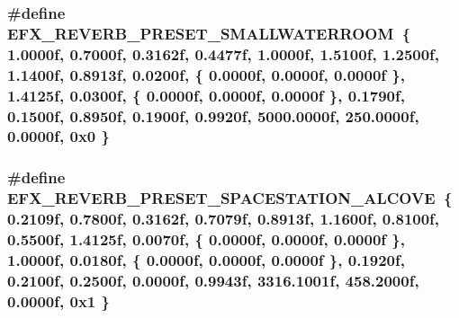 \subsubsection[{\texorpdfstring{E\+F\+X\+\_\+\+R\+E\+V\+E\+R\+B\+\_\+\+P\+R\+E\+S\+E\+T\+\_\+\+S\+M\+A\+L\+L\+W\+A\+T\+E\+R\+R\+O\+OM}{EFX_REVERB_PRESET_SMALLWATERROOM}}]{\setlength{\rightskip}{0pt plus 5cm}\#define E\+F\+X\+\_\+\+R\+E\+V\+E\+R\+B\+\_\+\+P\+R\+E\+S\+E\+T\+\_\+\+S\+M\+A\+L\+L\+W\+A\+T\+E\+R\+R\+O\+OM~\{ 1.\+0000f, 0.\+7000f, 0.\+3162f, 0.\+4477f, 1.\+0000f, 1.\+5100f, 1.\+2500f, 1.\+1400f, 0.\+8913f, 0.\+0200f, \{ 0.\+0000f, 0.\+0000f, 0.\+0000f \}, 1.\+4125f, 0.\+0300f, \{ 0.\+0000f, 0.\+0000f, 0.\+0000f \}, 0.\+1790f, 0.\+1500f, 0.\+8950f, 0.\+1900f, 0.\+9920f, 5000.\+0000f, 250.\+0000f, 0.\+0000f, 0x0 \}}\hypertarget{efx-presets_8h_aa3515cb632217a8fb55f06da1a4a7d1e}{}\label{efx-presets_8h_aa3515cb632217a8fb55f06da1a4a7d1e}
\subsubsection[{\texorpdfstring{E\+F\+X\+\_\+\+R\+E\+V\+E\+R\+B\+\_\+\+P\+R\+E\+S\+E\+T\+\_\+\+S\+P\+A\+C\+E\+S\+T\+A\+T\+I\+O\+N\+\_\+\+A\+L\+C\+O\+VE}{EFX_REVERB_PRESET_SPACESTATION_ALCOVE}}]{\setlength{\rightskip}{0pt plus 5cm}\#define E\+F\+X\+\_\+\+R\+E\+V\+E\+R\+B\+\_\+\+P\+R\+E\+S\+E\+T\+\_\+\+S\+P\+A\+C\+E\+S\+T\+A\+T\+I\+O\+N\+\_\+\+A\+L\+C\+O\+VE~\{ 0.\+2109f, 0.\+7800f, 0.\+3162f, 0.\+7079f, 0.\+8913f, 1.\+1600f, 0.\+8100f, 0.\+5500f, 1.\+4125f, 0.\+0070f, \{ 0.\+0000f, 0.\+0000f, 0.\+0000f \}, 1.\+0000f, 0.\+0180f, \{ 0.\+0000f, 0.\+0000f, 0.\+0000f \}, 0.\+1920f, 0.\+2100f, 0.\+2500f, 0.\+0000f, 0.\+9943f, 3316.\+1001f, 458.\+2000f, 0.\+0000f, 0x1 \}}\hypertarget{efx-presets_8h_aa9d3471810ca5d80f56f18841dd3abc8}{}\label{efx-presets_8h_aa9d3471810ca5d80f56f18841dd3abc8}
